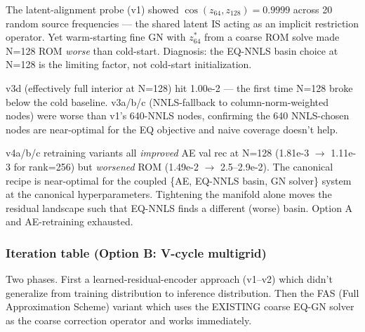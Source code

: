 The latent-alignment probe (v1) showed
$\cos(z_{64}, z_{128}) = 0.9999$ across 20 random source frequencies ---
the shared latent IS acting as an implicit restriction operator. Yet
warm-starting fine GN with $z_{64}^\ast$ from a coarse ROM solve made
N=128 ROM \emph{worse} than cold-start. Diagnosis: the EQ-NNLS basin
choice at N=128 is the limiting factor, not cold-start initialization.

v3d (effectively full interior at N=128) hit 1.00e-2 --- the first time
N=128 broke below the cold baseline. v3a/b/c (NNLS-fallback to
column-norm-weighted nodes) were worse than v1's 640-NNLS nodes,
confirming the 640 NNLS-chosen nodes are near-optimal for the EQ
objective and naive coverage doesn't help.

v4a/b/c retraining variants all \emph{improved} AE val rec at N=128
(1.81e-3 $\to$ 1.11e-3 for rank=256) but \emph{worsened} ROM (1.49e-2
$\to$ 2.5--2.9e-2). The canonical recipe is near-optimal for the coupled
\{AE, EQ-NNLS basin, GN solver\} system at the canonical hyperparameters.
Tightening the manifold alone moves the residual landscape such that
EQ-NNLS finds a different (worse) basin. Option A and AE-retraining
exhausted.

\subsubsection*{Iteration table (Option B: V-cycle multigrid)}

Two phases. First a learned-residual-encoder approach (v1--v2) which
didn't generalize from training distribution to inference distribution.
Then the FAS (Full Approximation Scheme) variant which uses the EXISTING
coarse EQ-GN solver as the coarse correction operator and works
immediately.

